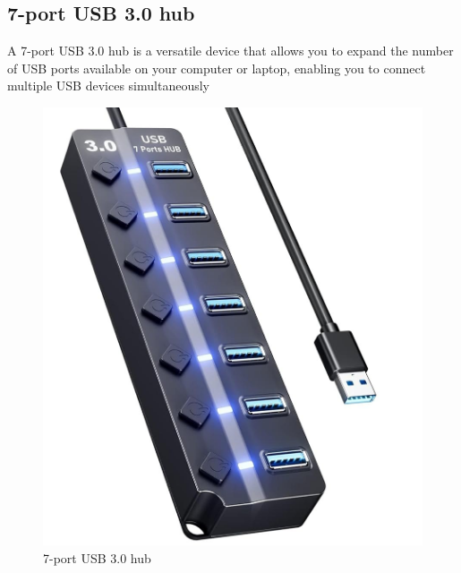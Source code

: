 \subsection{\fontsize{14}{16} 7-port USB 3.0 hub}
{
	\fontsize{12}{14}
	A 7-port USB 3.0 hub is a versatile device that allows you to expand the number of USB ports available on your computer or laptop, enabling you to connect multiple USB devices simultaneously
	
	\begin{figure}[H]
		\centering
		\includegraphics[scale=0.18]{images/Content/port_usb_hub}
		\caption{7-port USB 3.0 hub}
		\label{fig:porthub}
	\end{figure}
}


